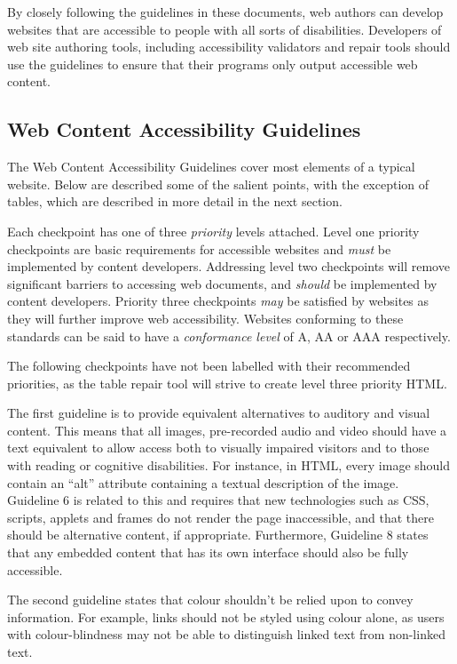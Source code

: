 By closely following the guidelines in these documents, web authors can develop
websites that are accessible to people with all sorts of disabilities.
Developers of web site authoring tools, including accessibility validators and
repair tools should use the guidelines to ensure that their programs only
output accessible web content.

\subsection{Web Content Accessibility Guidelines}

The Web Content Accessibility Guidelines cover most elements of a typical
website. Below are described some of the salient points, with the exception
of tables, which are described in more detail in the next section.

Each checkpoint has one of three \emph{priority} levels attached.  Level one
priority checkpoints are basic requirements for accessible websites and
\emph{must} be implemented by content developers. Addressing level two
checkpoints will remove significant barriers to accessing web documents, and
\emph{should} be implemented by content developers. Priority three checkpoints
\emph{may} be satisfied by websites as they will further improve web
accessibility. Websites conforming to these standards can be said to have a
\emph{conformance level} of A, AA or AAA respectively.

The following checkpoints have not been labelled with their
recommended priorities, as the table repair tool will strive to create level
three priority HTML. 

The first guideline is to provide equivalent alternatives to auditory and
visual content. This means that all images, pre-recorded audio and video should
have a text equivalent to allow access both to visually impaired visitors and
to those with reading or cognitive disabilities. For instance, in HTML, every
image should contain an ``alt'' attribute containing a textual description of
the image. Guideline 6 is related to this and requires that new technologies
such as CSS, scripts, applets and frames do not render the page inaccessible,
and that there should be alternative content, if appropriate. Furthermore,
Guideline 8 states that any embedded content that has its own interface
should also be fully accessible.

The second guideline states that colour shouldn't be relied upon to convey
information. For example, links should not be styled using colour alone, 
as users with colour-blindness may not be able to distinguish linked text from
non-linked text.

